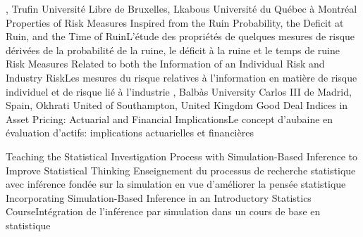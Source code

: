 {
,  {Trufin}
{Université Libre de Bruxelles},  {Lkabous}
{Université du Québec à Montréal}
}
{Properties of Risk Measures Inspired from the Ruin Probability, the Deficit at Ruin, and the Time of Ruin}{L'étude des propriétés de quelques mesures de risque dérivées de la probabilité de la ruine, le déficit à la ruine et le temps de ruine}
{\bubbleE \enspace \screenE}
{
}
{Risk Measures Related to both the Information of an Individual Risk and Industry Risk}{Les mesures du risque relatives à l’information en matière de risque individuel et de risque lié à l’industrie }
{\bubbleE \enspace \screenE}
{
,  {Balb\`as}
{University Carlos III de Madrid, Spain},  {Okhrati}
{United of Southampton, United Kingdom}
}
{Good Deal Indices in Asset Pricing: Actuarial and Financial Implications}{Le concept d’aubaine en évaluation d’actifs: implications actuarielles et financières}
{\bubbleE \enspace \screenE}


{
}
{Teaching the Statistical Investigation Process with Simulation-Based Inference to Improve Statistical Thinking }{Enseignement du processus de recherche statistique avec inférence fondée sur la simulation en vue d’améliorer la pensée statistique }
{\bubbleE \enspace \screenE}
{
}
{Incorporating Simulation-Based Inference in an Introductory Statistics Course}{Intégration de l’inférence par simulation dans un cours de base en statistique }
{\bubbleE \enspace \screenE}


